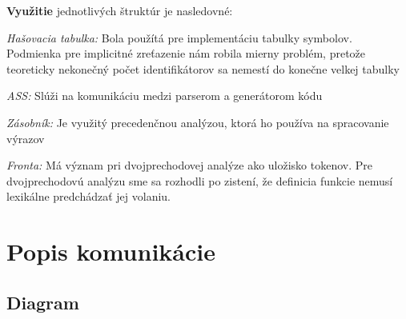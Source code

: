 \documentclass[a4paper, 12pt]{article}
\begin{document}
	\noindent \textbf{Využitie} jednotlivých štruktúr je nasledovné:\\
	\par\textit{Hašovacia tabulka: } Bola použítá pre implementáciu tabulky symbolov. Podmienka pre implicitné zreťazenie nám 
	robila mierny problém, pretože teoreticky nekonečný počet identifikátorov sa nemestí do konečne velkej tabulky \\
	\par\textit{ASS: } Slúži na komunikáciu medzi parserom a generátorom kódu\\
	\par\textit{Zásobník: } Je využitý precedenčnou analýzou, ktorá ho používa na spracovanie výrazov\\
	\par\textit{Fronta: } Má význam pri dvojprechodovej analýze ako uložisko tokenov. Pre dvojprechodovú analýzu sme sa rozhodli po
	zistení, že definicia funkcie nemusí lexikálne predchádzať jej volaniu.
	
	\newpage
	\section{Popis komunikácie}
	\subsection{Diagram}
	
	\begin{figure}[ht]
		\begin{center}
		\end{center}
	\end{figure}
\end{document}
